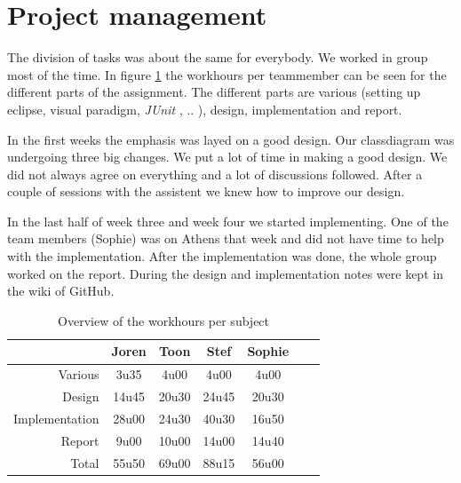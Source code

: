 \documentclass[i2]{oss}
\newcommand{\junit}{\emph{JUnit }}
\begin{document}
\section{Project management}
\label{ssec:Projectmanag}

The division of tasks was about the same for everybody. We worked in group most of the time. In figure \ref{tab:werkuren} the workhours per teammember can be seen for the different parts of the assignment. The different parts are various (setting up eclipse, visual paradigm, \junit, .. ), design, implementation and report. 

In the first weeks the emphasis was layed on a good design. Our classdiagram was undergoing three big changes. We put a lot of time in making a good design. We did not always agree on everything and a lot of discussions followed. After a couple of sessions with the assistent we knew how to improve our design. 

In the last half of week three and week four we started implementing. One of the team members (Sophie) was on Athens that week and did not have time to help with the implementation. After the implementation was done, the whole group worked on the report. During the design and implementation notes were kept in the wiki of GitHub.




\begin{table}[h!]
\begin{center}
    \begin{tabular}{ r | c  c  c  c  c  c}
     & Joren & Toon & Stef & Sophie \\ \hline
    Various & 3u35 & 4u00 & 4u00 & 4u00\\
        Design & 14u45 & 20u30 & 24u45 & 20u30 \\
        Implementation & 28u00 & 24u30 & 40u30 & 16u50\\
        Report & 9u00 & 10u00 & 14u00 & 14u40 \\
        Total & 55u50 & 69u00 & 88u15 & 56u00  
    \end{tabular}
    \caption{Overview of the workhours per subject}
    \label{tab:werkuren}
\end{center}
\end{table}
\end{document}
